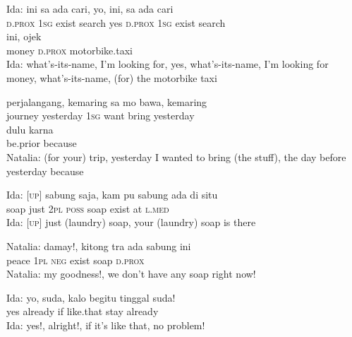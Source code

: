 \ea
\gll   Ida:    {ini}    {sa}   ada   cari,   yo,   ini,   sa   ada   cari\\
 {}     {\textsc{d.prox}}    {\textsc{1sg}}   exist   search   yes   \textsc{d.prox}   \textsc{1sg}   exist   search\\
    {ini,}    {ojek}\\
   {money}    {\textsc{d.prox}}    {motorbike.taxi}\\
\glt
Ida: what’s-its-name, I’m looking for, yes, what’s-its-name, I’m looking for money, what’s-its-name, (for) the motorbike taxi
\z

\ea
{}   perjalangang,   kemaring   sa   mo   bawa,   kemaring\\
   {}   journey   yesterday   \textsc{1sg}   want   bring   yesterday\\
\gll  dulu    {karna}\\
  be.prior    {because}\\
\glt
Natalia: (for your) trip, yesterday I wanted to bring (the stuff), the day before yesterday because
\z

\ea
\gll   Ida:   {\upshape\textsc{[up]}}   sabung   saja,   kam   pu   sabung   ada   di   situ\\
 {}   {}   soap   just   \textsc{2pl}   \textsc{poss}   soap   exist   at   \textsc{l.med}\\
\glt
Ida: [\textsc{up}] just (laundry) soap, your (laundry) soap is there
\z

\ea
\gll   Natalia:   damay!,   kitong   tra   ada   sabung   ini\\
 {}   peace   \textsc{1pl}   \textsc{neg}   exist   soap   \textsc{d.prox}\\
\glt
Natalia: my goodness!, we don’t have any soap right now!
\z

\ea
\gll   Ida:   yo,   suda,   kalo   begitu   tinggal   suda!\\
 {}    yes   already   if   like.that   stay   already\\
\glt
Ida: yes!, alright!, if it’s like that, no problem!
\z

